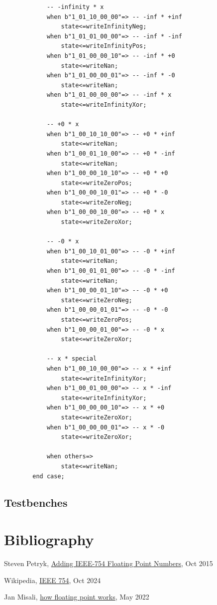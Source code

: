\documentclass[a4paper,10pt]{article}
\begin{document}
\begin{lstlisting}
			-- -infinity * x
			when b"1_01_10_00_00"=> -- -inf * +inf
				state<=writeInfinityNeg;
			when b"1_01_01_00_00"=> -- -inf * -inf
				state<=writeInfinityPos;
			when b"1_01_00_00_10"=> -- -inf * +0
				state<=writeNan;
			when b"1_01_00_00_01"=> -- -inf * -0
				state<=writeNan;
			when b"1_01_00_00_00"=> -- -inf * x
				state<=writeInfinityXor;

			-- +0 * x
			when b"1_00_10_10_00"=> -- +0 * +inf
				state<=writeNan;
			when b"1_00_01_10_00"=> -- +0 * -inf
				state<=writeNan;
			when b"1_00_00_10_10"=> -- +0 * +0
				state<=writeZeroPos;
			when b"1_00_00_10_01"=> -- +0 * -0
				state<=writeZeroNeg;
			when b"1_00_00_10_00"=> -- +0 * x
				state<=writeZeroXor;

			-- -0 * x
			when b"1_00_10_01_00"=> -- -0 * +inf
				state<=writeNan;
			when b"1_00_01_01_00"=> -- -0 * -inf
				state<=writeNan;
			when b"1_00_00_01_10"=> -- -0 * +0
				state<=writeZeroNeg;
			when b"1_00_00_01_01"=> -- -0 * -0
				state<=writeZeroPos;
			when b"1_00_00_01_00"=> -- -0 * x
				state<=writeZeroXor;

			-- x * special
			when b"1_00_10_00_00"=> -- x * +inf
				state<=writeInfinityXor;
			when b"1_00_01_00_00"=> -- x * -inf
				state<=writeInfinityXor;
			when b"1_00_00_00_10"=> -- x * +0
				state<=writeZeroXor;
			when b"1_00_00_00_01"=> -- x * -0
				state<=writeZeroXor;

			when others=>
				state<=writeNan;
		end case;
    \end{lstlisting}

    \newpage
    \subsection{Testbenches}
    \label{sec:AddTest}
    

    \newpage
    \label{sec:MulTest}
    

    \newpage
    \section{Bibliography}
    \begin{thebibliography}{9}
        Steven Petryk,
        \href{https://www.youtube.com/watch?v=mKJiD2ZAlwM}{Adding IEEE-754 Floating Point Numbers},
        Oct 2015

        Wikipedia,
        \href{https://en.wikipedia.org/wiki/IEEE_754}{IEEE 754},
        Oct 2024

        Jan Misali,
        \href{https://www.youtube.com/watch?v=dQhj5RGtag0}{how floating point works},
        May 2022
    \end{thebibliography}
\end{document}
